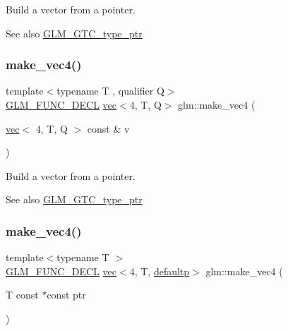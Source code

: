 Build a vector from a pointer. \begin{DoxySeeAlso}{See also}
\hyperlink{group__gtc__type__ptr}{G\+L\+M\+\_\+\+G\+T\+C\+\_\+type\+\_\+ptr} 
\end{DoxySeeAlso}
\mbox{\label{group__gtc__type__ptr_gaa95cb15732f708f613e65a0578895ae5}} 
\subsubsection{\texorpdfstring{make\+\_\+vec4()}{make\_vec4()}\hspace{0.1cm}{\footnotesize\ttfamily [4/5]}}
{\footnotesize\ttfamily template$<$typename T , qualifier Q$>$ \\
\hyperlink{setup_8hpp_ab2d052de21a70539923e9bcbf6e83a51}{G\+L\+M\+\_\+\+F\+U\+N\+C\+\_\+\+D\+E\+CL} \hyperlink{structglm_1_1vec}{vec}$<$4, T, Q$>$ glm\+::make\+\_\+vec4 (\begin{DoxyParamCaption}\item[{\hyperlink{structglm_1_1vec}{vec}$<$ 4, T, Q $>$ const \&}]{v }\end{DoxyParamCaption})\hspace{0.3cm}{\ttfamily [inline]}}

Build a vector from a pointer. \begin{DoxySeeAlso}{See also}
\hyperlink{group__gtc__type__ptr}{G\+L\+M\+\_\+\+G\+T\+C\+\_\+type\+\_\+ptr} 
\end{DoxySeeAlso}
\mbox{\label{group__gtc__type__ptr_ga63f576518993efc22a969f18f80e29bb}} 
\subsubsection{\texorpdfstring{make\+\_\+vec4()}{make\_vec4()}\hspace{0.1cm}{\footnotesize\ttfamily [5/5]}}
{\footnotesize\ttfamily template$<$typename T $>$ \\
\hyperlink{setup_8hpp_ab2d052de21a70539923e9bcbf6e83a51}{G\+L\+M\+\_\+\+F\+U\+N\+C\+\_\+\+D\+E\+CL} \hyperlink{structglm_1_1vec}{vec}$<$4, T, \hyperlink{namespaceglm_a36ed105b07c7746804d7fdc7cc90ff25a9d21ccd8b5a009ec7eb7677befc3bf51}{defaultp}$>$ glm\+::make\+\_\+vec4 (\begin{DoxyParamCaption}\item[{T const $\ast$const}]{ptr }\end{DoxyParamCaption})}

